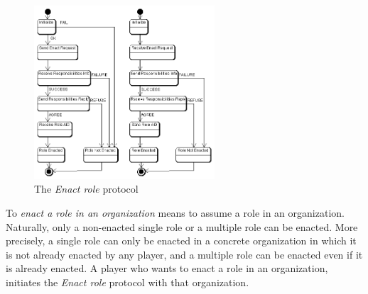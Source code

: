 \begin{figure}[ht]
	\centering
	\includegraphics[width=0.6\textwidth]{images/thespian/enact-role-protocol}
	\caption{The \textit{Enact role} protocol}
	\label{figure:thespian-enact-role-protocol}
\end{figure}

To \textit{enact a role in an organization} means to assume a role in an organization.
Naturally, only a non-enacted single role or a multiple role can be enacted.
More precisely, a single role can only be enacted in a concrete organization in which it is not already enacted by any player, and a multiple role can be enacted even if it is already enacted.
A player who wants to enact a role in an organization, initiates the \textit{Enact role} protocol with that organization.

